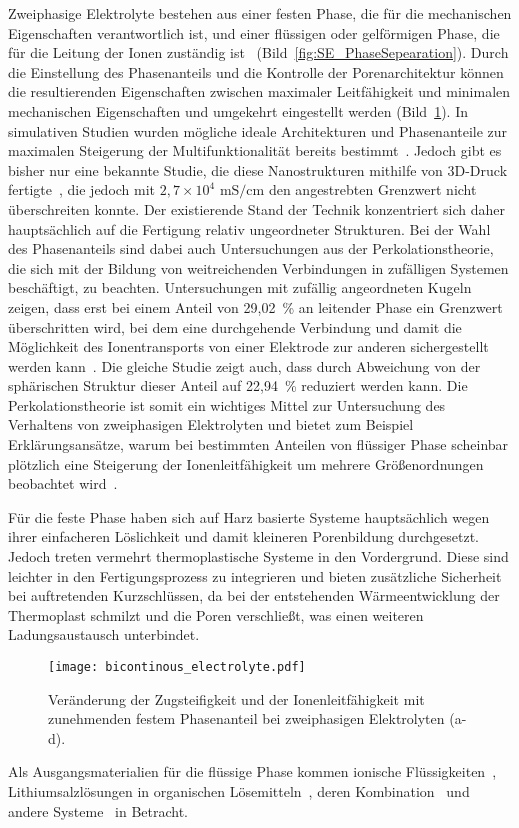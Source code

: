 Zweiphasige Elektrolyte bestehen aus einer festen Phase, die für die mechanischen Eigenschaften verantwortlich ist, und einer flüssigen oder gelförmigen Phase, die für die Leitung der Ionen zuständig ist~\cite{Ichino1995} (Bild~\ref{fig:SE_PhaseSepearation}). Durch die Einstellung des Phasenanteils und die Kontrolle der Porenarchitektur können die resultierenden Eigenschaften zwischen maximaler Leitfähigkeit und minimalen mechanischen Eigenschaften und umgekehrt eingestellt werden (Bild~\ref{fig:bicontinous_electrolyte}). In simulativen Studien wurden mögliche ideale Architekturen und Phasenanteile zur maximalen Steigerung der Multifunktionalität bereits bestimmt~\cite{Lee2019,Tu2020}. Jedoch gibt es bisher nur eine bekannte Studie, die diese Nanostrukturen mithilfe von 3D-Druck fertigte~\cite{Zekoll2018}, die jedoch mit $2,7 \times 10^4$ $\si{\milli \siemens \per \cm}$ den angestrebten Grenzwert nicht überschreiten konnte. Der existierende Stand der Technik konzentriert sich daher hauptsächlich auf die Fertigung relativ ungeordneter Strukturen. Bei der Wahl des Phasenanteils sind dabei auch Untersuchungen aus der Perkolationstheorie, die sich mit der Bildung von weitreichenden Verbindungen in zufälligen Systemen beschäftigt, zu beachten. Untersuchungen mit zufällig angeordneten Kugeln zeigen, dass erst bei einem Anteil von 29,02~\% an leitender Phase ein Grenzwert überschritten wird, bei dem eine durchgehende Verbindung und damit die Möglichkeit des Ionentransports von einer Elektrode zur anderen sichergestellt werden kann~\cite{Li2020b}. Die gleiche Studie zeigt auch, dass durch Abweichung von der sphärischen Struktur dieser Anteil auf 22,94~\% reduziert werden kann. Die Perkolationstheorie ist somit ein wichtiges Mittel zur Untersuchung des Verhaltens von zweiphasigen Elektrolyten und bietet zum Beispiel Erklärungsansätze, warum bei bestimmten Anteilen von flüssiger Phase scheinbar plötzlich eine Steigerung der Ionenleitfähigkeit um mehrere Größenordnungen beobachtet wird~\cite{Melodia2023}.

Für die feste Phase haben sich auf Harz basierte Systeme hauptsächlich wegen ihrer einfacheren Löslichkeit und damit kleineren Porenbildung durchgesetzt. Jedoch treten vermehrt thermoplastische Systeme in den Vordergrund. Diese sind leichter in den Fertigungsprozess zu integrieren und bieten zusätzliche Sicherheit bei auftretenden Kurzschlüssen, da bei der entstehenden Wärmeentwicklung der Thermoplast schmilzt und die Poren verschließt, was einen weiteren Ladungsaustausch unterbindet.
\begin{figure}[ht]
        \center
	\texttt{[image: bicontinous\_electrolyte.pdf]}
		\caption{\label{fig:bicontinous_electrolyte}Veränderung der Zugsteifigkeit und der Ionenleitfähigkeit mit zunehmenden festem Phasenanteil bei zweiphasigen Elektrolyten (a-d).}
\end{figure}
Als Ausgangsmaterialien für die flüssige Phase kommen ionische Flüssigkeiten~\cite{Huang2022,Shirshova2013,Wendong2021,Shirshova2014,Dzienia2020}, Lithiumsalzlösungen in organischen Lösemitteln~\cite{Gienger2015,Sakakibara2017}, deren Kombination~\cite{Shirshova2014,Yu2016} und andere Systeme~\cite{Feng2017} in Betracht.

